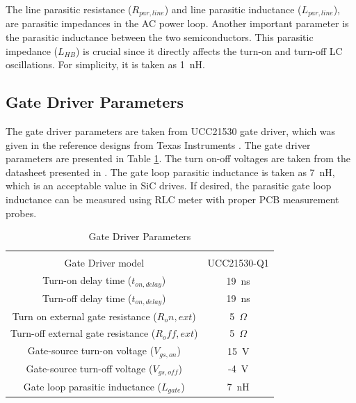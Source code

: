 \documentclass[12pt]{article} %
\begin{document}
The line parasitic resistance ($R_{par,line}$) and line parasitic inductance ($L_{par,line}$), are parasitic impedances in the AC power loop. Another important parameter is the parasitic inductance between the two semiconductors. This parasitic impedance ($L_{HB}$) is crucial since it directly affects the turn-on and turn-off LC oscillations. For simplicity, it is taken as 1~nH.

\subsection{Gate Driver Parameters}
The gate driver parameters are taken from UCC21530 gate driver, which was given in the reference designs from Texas Instruments \cite{TI}. The gate driver parameters are presented in Table \ref{tab:gatedriverparameters}. The turn on-off voltages are taken from the datasheet presented in \cite{Cree}. The gate loop parasitic inductance is taken as 7~nH, which is an acceptable value in SiC drives. If desired, the parasitic gate loop inductance can be measured using RLC meter with proper PCB measurement probes.

\begin{table}[h]
\centering
\caption{Gate Driver Parameters}
\label{tab:gatedriverparameters}
\begin{tabular}{cc}
\hline \\
Gate Driver model      &   UCC21530-Q1   \\
Turn-on delay time ($t_{on,delay}$)      &   19~ns   \\
Turn-off delay time ($t_{on,delay}$)    &   19~ns    \\
Turn on external gate resistance ($R_on,ext$)    &   5~$\Omega$    \\
Turn-off external gate resistance  ($R_off,ext$)     &   5~$\Omega$   \\
Gate-source turn-on voltage ($V_{gs,on}$) & 15~V\\
Gate-source turn-off voltage ($V_{gs,off}$) & -4~V\\
Gate loop parasitic inductance ($L_{gate}$) & 7~nH\\
\hline
\end{tabular}
\end{table}
\end{document}

